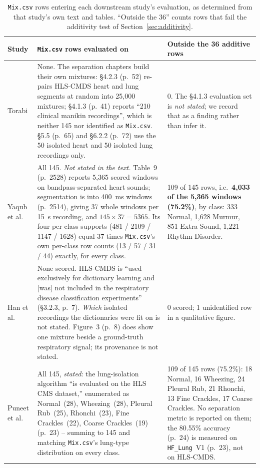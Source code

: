 \documentclass[11pt]{article}
\begin{document}
\begin{table}[htbp]
\centering
\small
\caption{\texttt{Mix.csv} rows entering each downstream study's evaluation,
as determined from that study's own text and tables. ``Outside the 36''
counts rows that fail the additivity test of
Section~\ref{sec:additivity}.}
\label{tab:downstream}
\begin{tabular}{@{}p{}p{}p{}@{}}
\toprule
Study & \texttt{Mix.csv} rows evaluated on & Outside the 36 additive rows \\
\midrule
Torabi \cite{aidriven} &
None. The separation chapters build their own mixtures: \S4.2.3 (p.~52)
re-pairs HLS-CMDS heart and lung segments at random into 25{,}000
mixtures; \S4.1.3 (p.~41) reports ``210 clinical manikin recordings'',
which is neither 145 nor identified as \texttt{Mix.csv}. \S5.5 (p.~65) and
\S6.2.2 (p.~72) use the 50 isolated heart and 50 isolated lung recordings
only. &
0. The \S4.1.3 evaluation set is \emph{not stated}; we record that as a
finding rather than infer it. \\
\addlinespace
Yaqub et al.\ \cite{spectrotemporal} &
All 145. \emph{Not stated in the text.} Table~9 (p.~2528) reports 5{,}365
scored windows on bandpass-separated heart sounds; segmentation is into
400~ms windows (p.~2514), giving 37 whole windows per 15~s recording, and
$145 \times 37 = 5365$. Its four per-class supports (481 / 2109 / 1147 /
1628) equal 37 times \texttt{Mix.csv}'s own per-class row counts (13 / 57 /
31 / 44) exactly, for every class. &
109 of 145 rows, i.e.\ \textbf{4{,}033 of the 5{,}365 windows (75.2\%)}, by
class: 333 Normal, 1{,}628 Murmur, 851 Extra Sound, 1{,}221 Rhythm
Disorder. \\
\addlinespace
Han et al.\ \cite{nmfcrnn} &
None scored. HLS-CMDS is ``used exclusively for dictionary learning and
[was] not included in the respiratory disease classification experiments''
(\S3.2.3, p.~7). \emph{Which} isolated recordings the dictionaries were fit
on is not stated. Figure~3 (p.~8) does show one mixture beside a
ground-truth respiratory signal; its provenance is not stated. &
0 scored; 1 unidentified row in a qualitative figure. \\
\addlinespace
Puneet et al.\ \cite{edgelung} &
All 145, \emph{stated}: the lung-isolation algorithm ``is evaluated on the
HLS CMS dataset,'' enumerated as Normal~(28), Wheezing~(28), Pleural
Rub~(25), Rhonchi~(23), Fine Crackles~(22), Coarse Crackles~(19) (p.~23) --
summing to 145 and matching \texttt{Mix.csv}'s lung-type distribution on
every class. &
109 of 145 rows (75.2\%): 18 Normal, 16 Wheezing, 24 Pleural Rub, 21
Rhonchi, 13 Fine Crackles, 17 Coarse Crackles. No separation metric is
reported on them; the 80.55\% accuracy (p.~24) is measured on \texttt{HF\_Lung}~V1
(p.~23), not on HLS-CMDS. \\
\bottomrule
\end{tabular}
\end{table}
\end{document}

